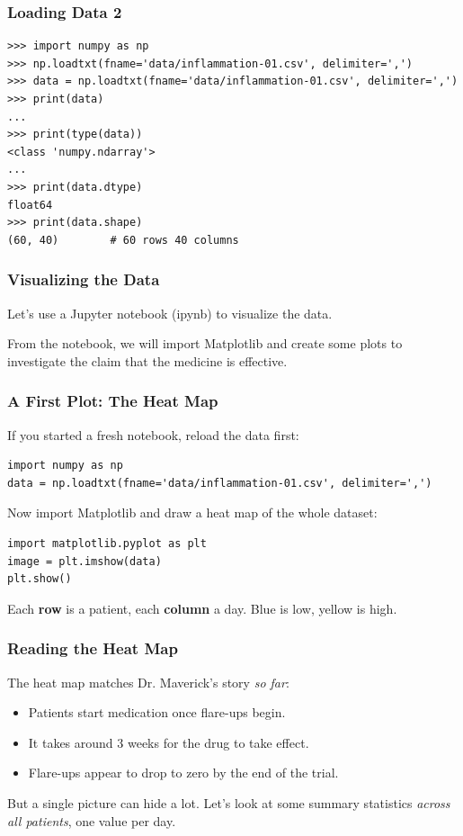 \documentclass{beamer}
\begin{document}
\begin{frame}[fragile]
    \frametitle{Loading Data 2}
    \begin{lstlisting}[style=demo]
>>> import numpy as np
>>> np.loadtxt(fname='data/inflammation-01.csv', delimiter=',')
>>> data = np.loadtxt(fname='data/inflammation-01.csv', delimiter=',')
>>> print(data)
...
>>> print(type(data))
<class 'numpy.ndarray'>
...
>>> print(data.dtype)
float64
>>> print(data.shape)
(60, 40)        # 60 rows 40 columns
    \end{lstlisting}
\end{frame}

\begin{frame}[fragile]
    \frametitle{Visualizing the Data}
    Let's use a Jupyter notebook (ipynb) to visualize the data.

    \bigskip

    From the notebook, we will import Matplotlib and create some plots to investigate the claim that the medicine is effective.
\end{frame}

\begin{frame}[fragile]
    \frametitle{A First Plot: The Heat Map}
    If you started a fresh notebook, reload the data first:
    \begin{lstlisting}[style=demo]
import numpy as np
data = np.loadtxt(fname='data/inflammation-01.csv', delimiter=',')
    \end{lstlisting}

    Now import Matplotlib and draw a heat map of the whole dataset:
    \begin{lstlisting}[style=demo]
import matplotlib.pyplot as plt
image = plt.imshow(data)
plt.show()
    \end{lstlisting}

    Each \textbf{row} is a patient, each \textbf{column} a day.
    Blue is low, yellow is high.
\end{frame}

\begin{frame}[fragile]
    \frametitle{Reading the Heat Map}
    The heat map matches Dr. Maverick's story \emph{so far}:
    \begin{itemize}
        \item Patients start medication once flare-ups begin.
        \item It takes around 3 weeks for the drug to take effect.
        \item Flare-ups appear to drop to zero by the end of the trial.
    \end{itemize}

    \bigskip

    But a single picture can hide a lot. Let's look at some summary
    statistics \emph{across all patients}, one value per day.
\end{frame}
\end{document}
